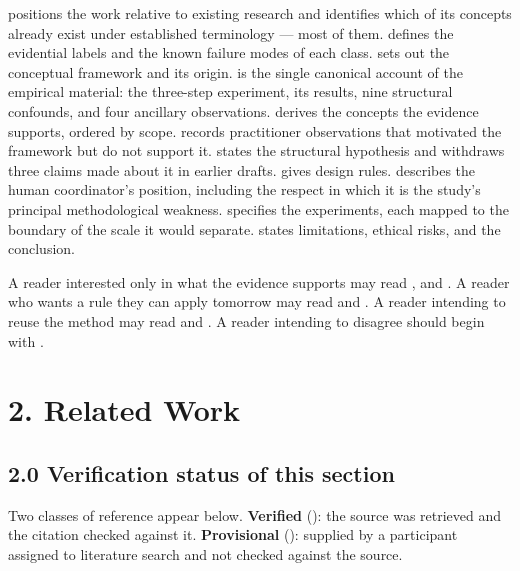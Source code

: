 \textbf{} positions the work relative to existing research and identifies which of its concepts already exist under established terminology — most of them. \textbf{} defines the evidential labels and the known failure modes of each class. \textbf{} sets out the conceptual framework and its origin. \textbf{} is the single canonical account of the empirical material: the three-step experiment, its results, nine structural confounds, and four ancillary observations. \textbf{} derives the concepts the evidence supports, ordered by scope. \textbf{} records practitioner observations that motivated the framework but do not support it. \textbf{} states the structural hypothesis and withdraws three claims made about it in earlier drafts. \textbf{} gives design rules. \textbf{} describes the human coordinator's position, including the respect in which it is the study's principal methodological weakness. \textbf{} specifies the experiments, each mapped to the boundary of the scale it would separate. \textbf{} states limitations, ethical risks, and the conclusion.

A reader interested only in what the evidence supports may read ,  and . A reader who wants a rule they can apply tomorrow may read  and . A reader intending to reuse the method may read  and . A reader intending to disagree should begin with .


\section*{2. Related Work}
\label{sec:en:2}


\subsection*{2.0 Verification status of this section}
\label{sec:en:2.0}

Two classes of reference appear below. \textbf{Verified} (\gcheck{}): the source was retrieved and the citation checked against it. \textbf{Provisional} (\gwarn{}): supplied by a participant assigned to literature search and not checked against the source.

